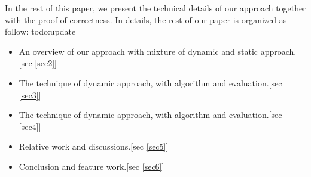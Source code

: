 In the rest of this paper, we present the technical details of our approach together with the proof of correctness. In details, the rest of our paper is organized as follow: todo:update

\begin{itemize}
\item An overview of our approach with mixture of dynamic and static approach.[sec \ref{sec2}]
\item The technique of dynamic approach, with algorithm and evaluation.[sec \ref{sec3}]
\item The technique of dynamic approach, with algorithm and evaluation.[sec \ref{sec4}]
\item Relative work and discussions.[sec \ref{sec5}]
\item Conclusion and feature work.[sec \ref{sec6}]
\end{itemize}
